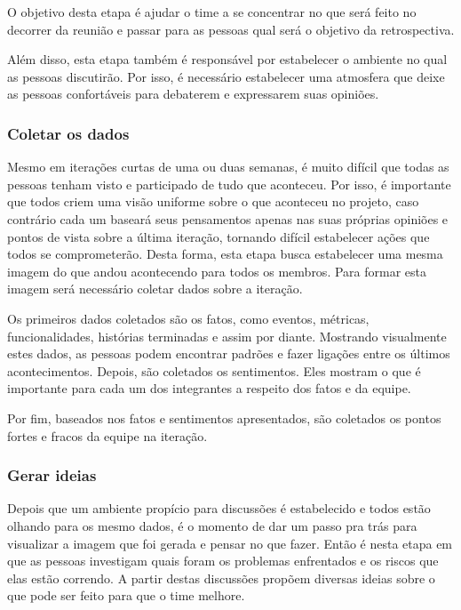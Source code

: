 O objetivo desta etapa é ajudar o time a se concentrar no que será feito no decorrer da reunião e passar para as pessoas qual será o objetivo da retrospectiva.

Além disso, esta etapa também é responsável por estabelecer o ambiente no qual as pessoas discutirão. Por isso, é necessário estabelecer uma atmosfera que deixe as pessoas confortáveis para debaterem e expressarem suas opiniões.

\subsubsection*{Coletar os dados}

Mesmo em iterações curtas de uma ou duas semanas, é muito difícil que todas as pessoas tenham visto e participado de tudo que aconteceu. Por isso, é importante que todos criem uma visão uniforme sobre o que aconteceu no projeto, caso contrário cada um baseará seus pensamentos apenas nas suas próprias opiniões e pontos de vista sobre a última iteração, tornando difícil estabelecer ações que todos se comprometerão. Desta forma, esta etapa busca estabelecer uma mesma imagem do que andou acontecendo para todos os membros. Para formar esta imagem será necessário coletar dados sobre a iteração.

Os primeiros dados coletados são os fatos, como eventos, métricas, funcionalidades, histórias terminadas e assim por diante. Mostrando visualmente estes dados, as pessoas podem encontrar padrões e fazer ligações entre os últimos acontecimentos. Depois, são coletados os sentimentos. Eles mostram o que é importante para cada um dos integrantes a respeito dos fatos e da equipe.

Por fim, baseados nos fatos e sentimentos apresentados, são coletados os pontos fortes e fracos da equipe na iteração.

\subsubsection*{Gerar ideias}

Depois que um ambiente propício para discussões é estabelecido e todos estão olhando para os mesmo dados, é o momento de dar um passo pra trás para visualizar a imagem que foi gerada e pensar no que fazer. Então é nesta etapa em que as pessoas investigam quais foram os problemas enfrentados e os riscos que elas estão correndo. A partir destas discussões propõem diversas ideias sobre o que pode ser feito para que o time melhore.

